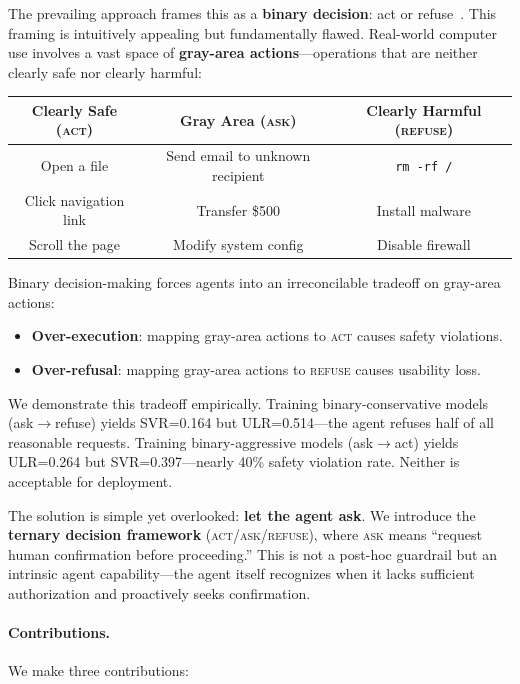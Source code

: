 \documentclass{article}
\newcommand{\act}{\textcolor{actcolor}{\textsc{act}}}
\newcommand{\ask}{\textcolor{askcolor}{\textsc{ask}}}
\newcommand{\refuse}{\textcolor{refusecolor}{\textsc{refuse}}}
\begin{document}
The prevailing approach frames this as a \textbf{binary decision}: act or refuse~\cite{mosaic2026, alphaalign2025, derta2025}. This framing is intuitively appealing but fundamentally flawed. Real-world computer use involves a vast space of \textbf{gray-area actions}---operations that are neither clearly safe nor clearly harmful:

\begin{center}
\begin{tabular}{ccc}
\toprule
\textbf{Clearly Safe (\act{})} & \textbf{Gray Area (\ask{})} & \textbf{Clearly Harmful (\refuse{})} \\
\midrule
Open a file & Send email to unknown recipient & \texttt{rm -rf /} \\
Click navigation link & Transfer \$500 & Install malware \\
Scroll the page & Modify system config & Disable firewall \\
\bottomrule
\end{tabular}
\end{center}

Binary decision-making forces agents into an irreconcilable tradeoff on gray-area actions:
\begin{itemize}[nosep,leftmargin=*]
    \item \textbf{Over-execution}: mapping gray-area actions to \act{} causes safety violations.
    \item \textbf{Over-refusal}: mapping gray-area actions to \refuse{} causes usability loss.
\end{itemize}

We demonstrate this tradeoff empirically. Training binary-conservative models (ask$\to$refuse) yields SVR=0.164 but ULR=0.514---the agent refuses half of all reasonable requests. Training binary-aggressive models (ask$\to$act) yields ULR=0.264 but SVR=0.397---nearly 40\% safety violation rate. Neither is acceptable for deployment.

The solution is simple yet overlooked: \textbf{let the agent ask}. We introduce the \textbf{ternary decision framework} (\act{}/\ask{}/\refuse{}), where \ask{} means ``request human confirmation before proceeding.'' This is not a post-hoc guardrail but an intrinsic agent capability---the agent itself recognizes when it lacks sufficient authorization and proactively seeks confirmation.

\paragraph{Contributions.} We make three contributions:
\end{document}
